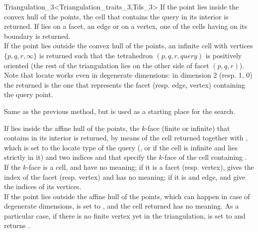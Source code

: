 \begin{ccRefClass}{Triangulation_3<Triangulation_traits_3,Tds_3>}
{
If the point  lies inside the convex hull of the points, the cell 
that contains the query in its interior is returned. If  lies on a
facet, an edge or on a vertex, one of the cells having  on
its boundary is returned.\\ 
If the point  lies outside the convex hull of the points,
an infinite cell with vertices $\{ p, q, r, \infty\}$ is returned such that
the tetrahedron $( p, q, r, query )$ is positively oriented
(the rest of the triangulation lies on the other side of facet 
$( p, q, r )$). \\
Note that locate works even in degenerate dimensions: in dimension 2
(resp. 1, 0) the  returned is the one that represents
the facet (resp. edge, vertex) containing the query point.
}

{Same as the previous method, but  is used as a starting
place for the search.}

{If  lies inside the affine hull of the points, the $k$-face
(finite or infinite) that contains  in its interior is
returned, by means of the cell returned together with , which
is set to the locate type of the query (, or  if the cell is infinite and 
lies strictly in it) and two indices  and  that
specify the $k$-face of the cell containing .\\ 
If the $k$-face is a cell,  and  have no
meaning; if it is a facet (resp. vertex),  gives the index of
the facet (resp. vertex) and  has no meaning; if it is and
edge,  and  give the indices of its vertices.\\ 
If the point  lies outside the affine hull of the points,
which can happen in case of degenerate dimensions,  is set to
, and the cell returned has no meaning.
As a particular case, if there is no finite vertex yet in the
triangulation,  is set to  and
 returns . 
}


\end{ccRefClass}
